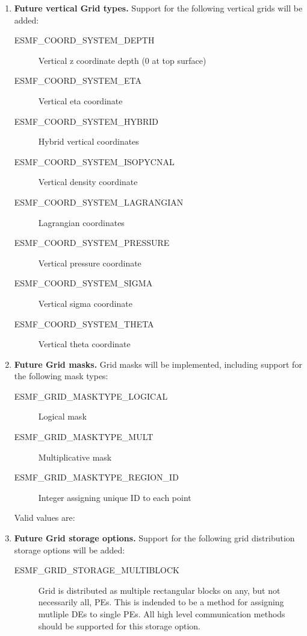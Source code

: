 \begin{enumerate}
\item {\bf Future vertical Grid types.}  Support for the following
vertical grids will be added:
 \begin{description}
    \item [ESMF\_COORD\_SYSTEM\_DEPTH]
          Vertical z coordinate depth (0 at top surface)
    \item [ESMF\_COORD\_SYSTEM\_ETA]
          Vertical eta coordinate
    \item [ESMF\_COORD\_SYSTEM\_HYBRID]
          Hybrid vertical coordinates
    \item [ESMF\_COORD\_SYSTEM\_ISOPYCNAL]
          Vertical density coordinate
    \item [ESMF\_COORD\_SYSTEM\_LAGRANGIAN]
          Lagrangian coordinates
    \item [ESMF\_COORD\_SYSTEM\_PRESSURE]
          Vertical pressure coordinate
    \item [ESMF\_COORD\_SYSTEM\_SIGMA]
          Vertical sigma coordinate
    \item [ESMF\_COORD\_SYSTEM\_THETA]
          Vertical theta coordinate
 \end{description}

\item {\bf Future Grid masks.}  Grid masks will be implemented, including
support for the following mask types:
 \begin{description}
    \item [ESMF\_GRID\_MASKTYPE\_LOGICAL]
          Logical mask
    \item [ESMF\_GRID\_MASKTYPE\_MULT]
          Multiplicative mask
    \item [ESMF\_GRID\_MASKTYPE\_REGION\_ID]
          Integer assigning unique ID to each point
 \end{description}

    
 Valid values are:
\item {\bf Future Grid storage options.}  Support for the following grid
distribution storage options will be added:
 \begin{description}
    \item [ESMF\_GRID\_STORAGE\_MULTIBLOCK]
          Grid is distributed as multiple rectangular blocks on any, but not
          necessarily all, PEs.  This is indended to be a method for assigning
          mutliple DEs to single PEs.  All high level communication methods
          should be supported for this storage option.
 \end{description}

\end{enumerate}


